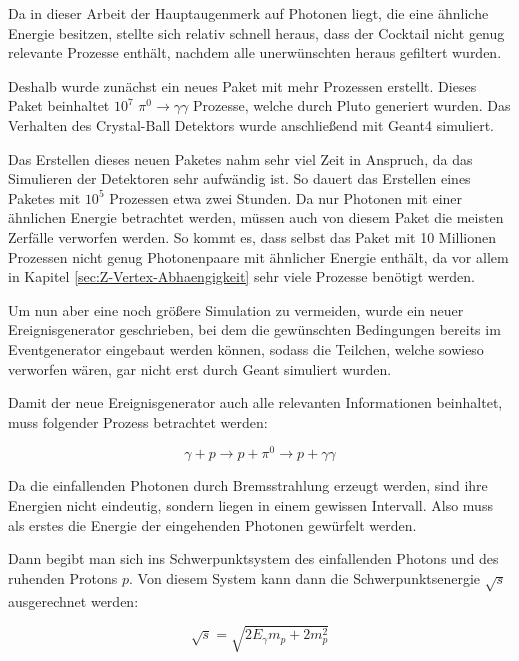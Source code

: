 \documentclass[a4paper,11pt,oneside,final,german,openbib,pdftex]{scrbook}
\begin{document}
{Da in dieser Arbeit der Hauptaugenmerk auf Photonen liegt, die eine \"ahnliche Energie besitzen, stellte sich relativ schnell heraus, dass der Cocktail nicht genug relevante Prozesse enth\"alt, nachdem alle unerw\"unschten heraus gefiltert wurden. 

Deshalb wurde zun\"achst ein neues Paket mit mehr Prozessen erstellt. 
Dieses Paket beinhaltet $10^7$ $\pi^0 \rightarrow \gamma \gamma$ Prozesse, welche durch Pluto generiert wurden. Das Verhalten des Crystal-Ball Detektors wurde anschlie{\ss}end mit Geant4 simuliert.

Das Erstellen dieses neuen Paketes nahm sehr viel Zeit in Anspruch, da das Simulieren der Detektoren sehr aufw\"andig ist. So dauert das Erstellen eines Paketes mit $10^5$ Prozessen etwa zwei Stunden. Da nur Photonen mit einer \"ahnlichen Energie betrachtet werden, m\"ussen auch von diesem Paket die meisten Zerf\"alle verworfen werden. So kommt es, dass selbst das Paket mit 10 Millionen Prozessen nicht genug Photonenpaare mit \"ahnlicher Energie enth\"alt, da vor allem in Kapitel \ref{sec:Z-Vertex-Abhaengigkeit} sehr viele Prozesse ben\"otigt werden.

Um nun aber eine noch größere Simulation zu vermeiden, wurde ein neuer Ereignisgenerator geschrieben, bei dem die gew\"unschten Bedingungen bereits im Eventgenerator eingebaut werden k\"onnen, sodass die Teilchen, welche sowieso verworfen w\"aren, gar nicht erst durch Geant simuliert wurden. 

Damit der neue Ereignisgenerator auch alle relevanten Informationen beinhaltet, muss folgender Prozess betrachtet werden:

\begin{equation}
\gamma + p \rightarrow p + \pi^0 \rightarrow p + \gamma \gamma 
\end{equation}

Da die einfallenden Photonen durch Bremsstrahlung erzeugt werden, sind ihre Energien nicht eindeutig, sondern liegen in einem gewissen Intervall. Also muss als erstes die Energie der eingehenden Photonen gew\"urfelt werden.

Dann begibt man sich ins Schwerpunktsystem des einfallenden Photons und des ruhenden Protons $p$. 
Von diesem System kann dann die Schwerpunktsenergie $\sqrt{s}$ ausgerechnet werden:

\begin{equation}
\sqrt{s}= \sqrt{2E_{\gamma}m_p+2m_p^2}
\end{equation}

}
\end{document}
